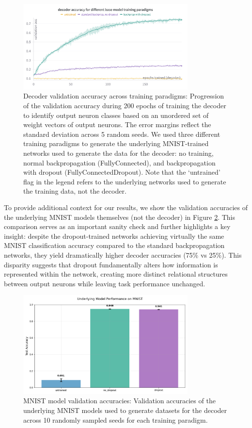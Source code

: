 \documentclass[11pt]{article}
\begin{document}
\begin{figure}[htbp]
\centering
\includegraphics[width=0.8\textwidth]{figures/decoder-validation-accuracy-training-paradigms.png}
\caption{Decoder validation accuracy across training paradigms: Progression of the validation accuracy during 200 epochs of training the decoder to identify output neuron classes based on an unordered set of weight vectors of output neurons. The error margins reflect the standard deviation across 5 random seeds. We used three different training paradigms to generate the underlying MNIST-trained networks used to generate the data for the decoder: no training, normal backpropagation (FullyConnected), and backpropagation with dropout (FullyConnectedDropout). Note that the `untrained' flag in the legend refers to the underlying networks used to generate the training data, not the decoder.}
\label{fig:decoder-validation-accuracy}
\end{figure}

To provide additional context for our results, we show the validation accuracies of the underlying MNIST models themselves (not the decoder) in Figure \ref{fig:mnist-accuracies}. This comparison serves as an important sanity check and further highlights a key insight: despite the dropout-trained networks achieving virtually the same MNIST classification accuracy compared to the standard backpropagation networks, they yield dramatically higher decoder accuracies (75\% vs 25\%). This disparity suggests that dropout fundamentally alters how information is represented within the network, creating more distinct relational structures between output neurons while leaving task performance unchanged.

\begin{figure}[htbp]
\centering
\includegraphics[width=0.8\textwidth]{figures/mnist-model-validation-accuracies.png}
\caption{MNIST model validation accuracies: Validation accuracies of the underlying MNIST models used to generate datasets for the decoder across 10 randomly sampled seeds for each training paradigm.}
\label{fig:mnist-accuracies}
\end{figure}
\end{document}
